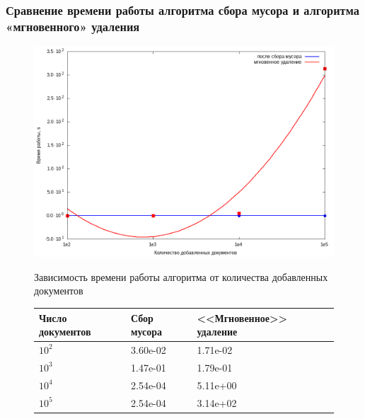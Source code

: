\documentclass[aspectratio=169, pdf, 8pt, unicode]{beamer}
\begin{document}
\begin{frame}[fragile]
\frametitle{Сравнение времени работы алгоритма сбора мусора и алгоритма
«мгновенного» удаления}
\begin{figure}[H]
\centering
\begin{minipage}[h]{0.475\linewidth}
\includegraphics[width=1\textwidth]{fig/time.png}
\caption{Зависимость времени работы алгоритма от количества добавленных документов}
\end{minipage}
\hfil
\begin{minipage}[h]{0.35\linewidth}
\caption{Время работы алгоритмов, с}
\begin{table}[H]
      \centering
      \small
      \singlespacing
      \begin{tabular}{|p{1.5cm}|p{1.5cm}|p{2cm}|}
        \hline
        Число документов & Сбор мусора                & <<Мгновенное>> удаление \\ \hline \hline
        $10^2$           & 3.60e-02                   & 1.71e-02              \\ \hline
        $10^3$           & 1.47e-01                   & 1.79e-01              \\ \hline
        $10^4$           & 2.54e-04                   & 5.11e+00              \\ \hline
        $10^5$           & 2.54e-04                   & 3.14e+02              \\ \hline
\end{tabular}
\end{table}
\end{minipage}
\end{figure}
\end{frame}
\end{document}
